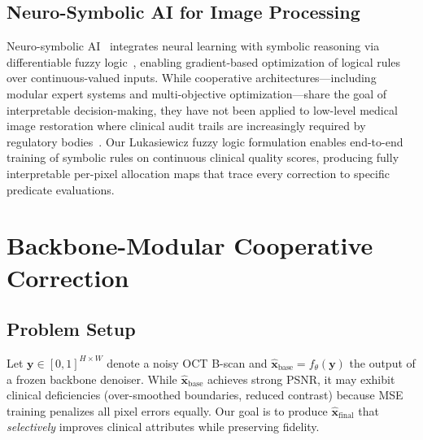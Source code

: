 \documentclass{ieeetj}
\begin{document}
\subsection{Neuro-Symbolic AI for Image Processing}
Neuro-symbolic AI~\cite{garcez2023neurosymbolic} integrates neural learning with symbolic reasoning via differentiable fuzzy logic~\cite{vankrieken2022analyzing}, enabling gradient-based optimization of logical rules over continuous-valued inputs. While cooperative architectures---including modular expert systems and multi-objective optimization---share the goal of interpretable decision-making, they have not been applied to low-level medical image restoration where clinical audit trails are increasingly required by regulatory bodies~\cite{fdaaiml2021}. Our Lukasiewicz fuzzy logic formulation enables end-to-end training of symbolic rules on continuous clinical quality scores, producing fully interpretable per-pixel allocation maps that trace every correction to specific predicate evaluations.


\section{Backbone-Modular Cooperative Correction}
\label{sec:cooperative}

\subsection{Problem Setup}
\label{sec:problem_setup}
Let $\mathbf{y} \in [0,1]^{H \times W}$ denote a noisy OCT B-scan and $\hat{\mathbf{x}}_\text{base} = f_\theta(\mathbf{y})$ the output of a frozen backbone denoiser. While $\hat{\mathbf{x}}_\text{base}$ achieves strong PSNR, it may exhibit clinical deficiencies (over-smoothed boundaries, reduced contrast) because MSE training penalizes all pixel errors equally. Our goal is to produce $\hat{\mathbf{x}}_\text{final}$ that \emph{selectively} improves clinical attributes while preserving fidelity.
\end{document}
